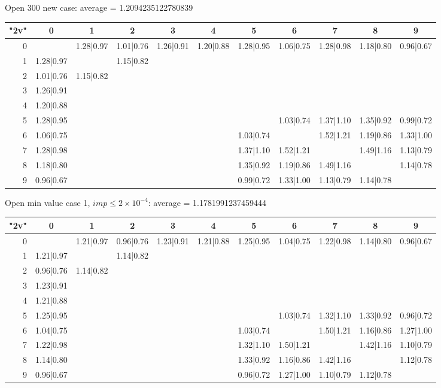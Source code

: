 \begin{table}

	\centering
	
		Open 300 new case: average = 1.2094235122780839
	

	
	\begin{tabular}{|r||c|c|c|c|c|c|c|c|c|c|}\hline
		{\bf "2v"} & 0 & 1 & 2 & 3 & 4 & 5 & 6 & 7 & 8 & 9 \\\hline\hline
		0 & &1.28|0.97 &1.01|0.76 &1.26|0.91 &1.20|0.88 &1.28|0.95 &1.06|0.75 &1.28|0.98 &1.18|0.80 &0.96|0.67  \\\hline
		1 &1.28|0.97 & &1.15|0.82 & & & & & & &  \\\hline
		2 &1.01|0.76 &1.15|0.82 & & & & & & & &  \\\hline
		3 &1.26|0.91 & & & & & & & & &  \\\hline
		4 &1.20|0.88 & & & & & & & & &  \\\hline
		5 &1.28|0.95 & & & & & &1.03|0.74 &1.37|1.10 &1.35|0.92 &0.99|0.72  \\\hline
		6 &1.06|0.75 & & & & &1.03|0.74 & &1.52|1.21 &1.19|0.86 &1.33|1.00  \\\hline
		7 &1.28|0.98 & & & & &1.37|1.10 &1.52|1.21 & &1.49|1.16 &1.13|0.79  \\\hline
		8 &1.18|0.80 & & & & &1.35|0.92 &1.19|0.86 &1.49|1.16 & &1.14|0.78  \\\hline
		9 &0.96|0.67 & & & & &0.99|0.72 &1.33|1.00 &1.13|0.79 &1.14|0.78 &  \\\hline
	\end{tabular}
	
	\vspace{0.6cm}
	
	Open min value case 1, $imp\leq 2\times10^{-4}$: average = 1.1781991237459444
	
	\vspace{0.6cm}
	
		\begin{tabular}{|r||c|c|c|c|c|c|c|c|c|c|}\hline
		{\bf "2v"} & 0 & 1 & 2 & 3 & 4 & 5 & 6 & 7 & 8 & 9 \\\hline\hline
	0 & &1.21|0.97 &0.96|0.76 &1.23|0.91 &1.21|0.88 &1.25|0.95 &1.04|0.75 &1.22|0.98 &1.14|0.80 &0.96|0.67  \\\hline
	1 &1.21|0.97 & &1.14|0.82 & & & & & & &  \\\hline
	2 &0.96|0.76 &1.14|0.82 & & & & & & & &  \\\hline
	3 &1.23|0.91 & & & & & & & & &  \\\hline
	4 &1.21|0.88 & & & & & & & & &  \\\hline
	5 &1.25|0.95 & & & & & &1.03|0.74 &1.32|1.10 &1.33|0.92 &0.96|0.72  \\\hline
	6 &1.04|0.75 & & & & &1.03|0.74 & &1.50|1.21 &1.16|0.86 &1.27|1.00  \\\hline
	7 &1.22|0.98 & & & & &1.32|1.10 &1.50|1.21 & &1.42|1.16 &1.10|0.79  \\\hline
	8 &1.14|0.80 & & & & &1.33|0.92 &1.16|0.86 &1.42|1.16 & &1.12|0.78  \\\hline
	9 &0.96|0.67 & & & & &0.96|0.72 &1.27|1.00 &1.10|0.79 &1.12|0.78 &  \\\hline
	\end{tabular}
	

\end{table}
